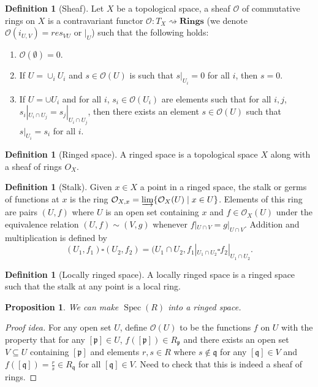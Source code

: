 \documentclass[paper=a4, fontsize=12pt]{scrartcl} %
\newtheorem{prop}[thm]{Proposition}
\theoremstyle{definition}
\newtheorem{defn}[thm]{Definition}
\theoremstyle{remark}
\newcommand{\mO}{\mathcal{O}}
\newcommand{\lp}{{\mathfrak{p}}}
\DeclareMathOperator{\spec}{Spec}
\begin{document}
\begin{defn}[Sheaf]
	Let $X$ be a topological space, a sheaf $\mO$ of commutative rings on $X$ is a contravariant functor $\mO: T_X \rightsquigarrow \textbf{Rings}$ (we denote $\mO(i_{U,V}) = res_{VU}$ or $|_{U}$) such that the following holds:
	\begin{enumerate}
		\item $\mO(\emptyset) = 0$.
		\item If $U = \cup_i U_i$ and $s \in \mO(U)$ is such that $s|_{U_i} = 0$ for all $i$, then $s = 0$.
		\item If $U = \cup U_i$ and for all $i$, $s_i \in \mO(U_i)$ are elements such that for all $i,j$, $s_i|_{U_i \cap U_j} = s_j|_{U_i \cap U_j}$, then there exists an element $s \in \mO(U)$ such that $s|_{U_i} = s_i$ for all $i$.
	\end{enumerate}
\end{defn}
\begin{defn}[Ringed space]
	A ringed space is a topological space $X$ along with a sheaf of rings $O_X$.
\end{defn}
\begin{defn}[Stalk]
	Given $x \in X$ a point in a ringed space, the stalk or germs of functions at $x$ is the ring $\mO_{X,x} = \varinjlim \{\mO_{X}(U) \mid x \in U\}$. Elements of this ring are pairs $(U,f)$ where $U$ is an open set containing $x$ and $f \in \mO_X(U)$ under the equivalence relation $(U,f) \sim (V,g)$ whenever $f|_{U \cap V} = g|_{U \cap V}$. Addition and multiplication is defined by 
	\[(U_1, f_1) \square (U_2, f_2) = (U_1 \cap U_2, f_1|_{U_1 \cap U_2} \square f_2|_{U_1 \cap U_2}.\]
\end{defn}
\begin{defn}[Locally ringed space]
	A locally ringed space is a ringed space such that the stalk at any point is a local ring.
\end{defn}
\begin{prop}
	We can make $\spec(R)$ into a ringed space.
\end{prop}
\begin{proof}[Proof idea]
	For any open set $U$, define $\mO(U)$ to be the functions $f$ on $U$ with the property that for any $[\lp] \in U$, $f([\lp]) \in R_{\lp}$ and there exists an open set $V \subseteq U$ containing $[\lp]$ and elements $r,s \in R$ where $s \notin \mathfrak{q}$ for any $[\mathfrak{q}] \in V$ and $f([\mathfrak{q}]) = \frac{r}{s} \in R_{\mathfrak{q}}$ for all $[\mathfrak{q}]\in V$. Need to check that this is indeed a sheaf of rings.
\end{proof}
\end{document}
